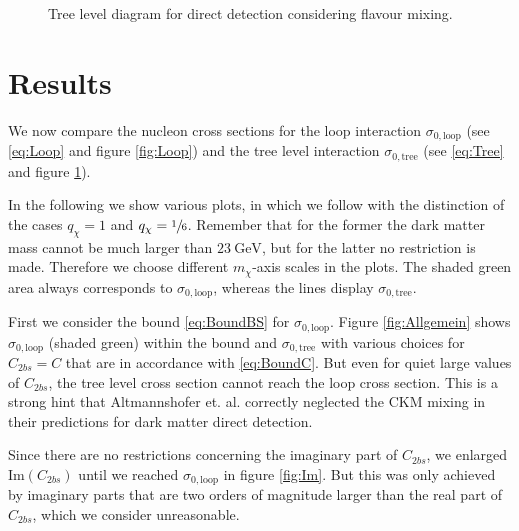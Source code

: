 \begin{figure}
	\centering
	
	\caption{Tree level diagram for direct detection considering flavour mixing.}
	\label{fig:Tree}
\end{figure}

\section{Results}
We now compare the nucleon cross sections for the loop interaction $\sigma_{0,\text{loop}}$ (see \eqref{eq:Loop} and figure \ref{fig:Loop}) and the tree level interaction $\sigma_{0,\text{tree}}$ (see \eqref{eq:Tree} and figure \ref{fig:Tree}).


In the following we show various plots, in which we follow \cite{Z} with the distinction of the cases $q_\chi= 1$ and $q_\chi=\sfrac{1}{6}$. Remember that for the former the dark matter mass cannot be much larger than $\SI{23}{\giga\electronvolt}$, but for the latter no restriction is made. Therefore we choose different $m_\chi$-axis scales in the plots. The shaded green area always corresponds to $\sigma_{0,\text{loop}}$, whereas the lines display $\sigma_{0,\text{tree}}$.


First we consider the bound \eqref{eq:BoundBS} for $\sigma_{0,\text{loop}}$. Figure \ref{fig:Allgemein} shows $\sigma_{0,\text{loop}}$ (shaded green) within the bound and $\sigma_{0,\text{tree}}$ with various choices for $C_{2bs} = C$ that are in accordance with \eqref{eq:BoundC}. But even for quiet large values of $C_{2bs}$, the tree level cross section cannot reach the loop cross section. This is a strong hint that Altmannshofer et. al. correctly neglected the CKM mixing in their predictions for dark matter direct detection.



Since there are no restrictions concerning the imaginary part of $C_{2bs}$, we enlarged $\text{Im}(C_{2bs})$ until we reached $\sigma_{0,\text{loop}}$ in figure \ref{fig:Im}. But this was only achieved by imaginary parts that are two orders of magnitude larger than the real part of $C_{2bs}$, which we consider unreasonable.




